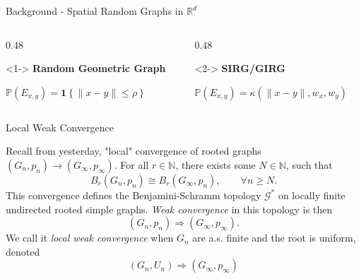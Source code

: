 \documentclass[aspectratio=169]{beamer}
\begin{document}
\begin{frame}{Background - Spatial Random Graphs in $\mathbb{R}^d$}

\begin{columns}[T,onlytextwidth]
    \begin{column}{0.48\textwidth}
        \centering
        \begin{uncoverenv}<1->
        \textbf{Random Geometric Graph}\par
        \vspace{0.12cm}
        \resizebox{0.82\linewidth}{!}{}
        \par\vspace{0.12cm}
        \(
            \displaystyle
            \mathbb{P}(E_{x,y})
            = \mathbf{1}\!\left\{\lVert x-y\rVert \leq \rho\right\}
        \)
        \end{uncoverenv}
    \end{column}
    \begin{column}{0.48\textwidth}
        \centering
        \begin{uncoverenv}<2->
        \textbf{SIRG/GIRG}\par
        \vspace{0.12cm}
        \resizebox{0.82\linewidth}{!}{}
        \par\vspace{0.12cm}
        \(
            \displaystyle
            \mathbb{P}(E_{x,y})
            = \kappa\!\left(\lVert x-y\rVert,w_x,w_y\right)
        \)
        \end{uncoverenv}
    \end{column}
\end{columns}

\end{frame}

\begin{frame}{Local Weak Convergence}

Recall from yesterday, "local" convergence of rooted graphs $(G_n, p_n) \to (G_\infty, p_\infty)$. For all $r \in \mathbb{N}$, there exists some $N \in \mathbb{N}$, such that 
$$ 
B_r(G_n, p_n) \cong B_r(G_\infty, p_n), \qquad \forall n \geq N.
$$
This convergence defines the Benjamini-Schramm topology $\mathcal{G}^*$ on locally finite undirected rooted simple graphs. \textit{Weak convergence} in this topology is then
$$
(G_n, p_n) \Rightarrow (G_\infty, p_\infty).
$$
We call it \textit{local weak convergence} when $G_n$ are a.s. finite and the root is uniform, denoted
$$
(G_n, U_n) \Rightarrow (G_\infty, p_\infty)
$$


\end{frame}
\end{document}
